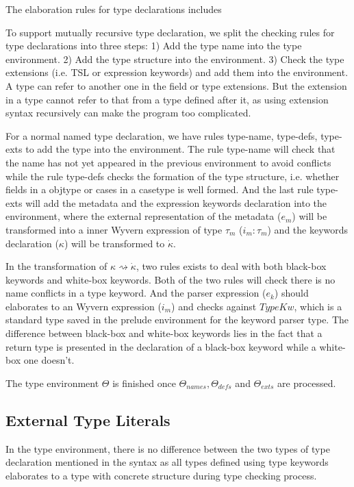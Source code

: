 \documentclass{sig-alternate}
\begin{document}
The elaboration rules for type declarations includes 

To support mutually recursive type declaration, we split the checking rules for type declarations into three steps: 1) Add the type name into the type environment. 2) Add the type structure into the environment. 3) Check the type extensions (i.e. TSL or expression keywords) and add them into the environment. A type can refer to another one in the field or type extensions. But the extension in a type cannot refer to that from a type defined after it, as using extension syntax recursively can make the program too complicated.

For a normal named type declaration, we have rules type-name, type-defs, type-exts to add the type into the environment. The rule type-name will check that the name has not yet appeared in the previous environment to avoid conflicts while the rule type-defs checks the formation of the type structure, i.e. whether fields in a objtype or cases in a casetype is well formed. And the last rule type-exts will add the metadata and the expression keywords declaration into the environment, where the external representation of the metadata ($e_m$) will be transformed into a inner Wyvern expression of type $\tau_m$ ($i_m:\tau_m$) and the keywords declaration ($\kappa$) will be transformed to $\dot\kappa$. 

In the transformation of $\kappa\rightsquigarrow\dot\kappa$, two rules exists to deal with both black-box keywords and white-box keywords. Both of the two rules will check there is no name conflicts in a type keyword. And the parser expression ($e_k$) should elaborates to an Wyvern expression ($i_m$) and checks against $TypeKw$, which is a standard type saved in the prelude environment for the keyword parser type. The difference between black-box and white-box keywords lies in the fact that a return type is presented in the declaration of a black-box keyword while a white-box one doesn't.

The type environment $\Theta$ is finished once $\Theta_{names}, \Theta_{defs}$ and $\Theta_{exts}$ are processed.

\subsection{External Type Literals}
In the type environment, there is no difference between the two types of type declaration mentioned in the syntax as all types defined using type keywords elaborates to a type with concrete structure during type checking process.
\end{document}

